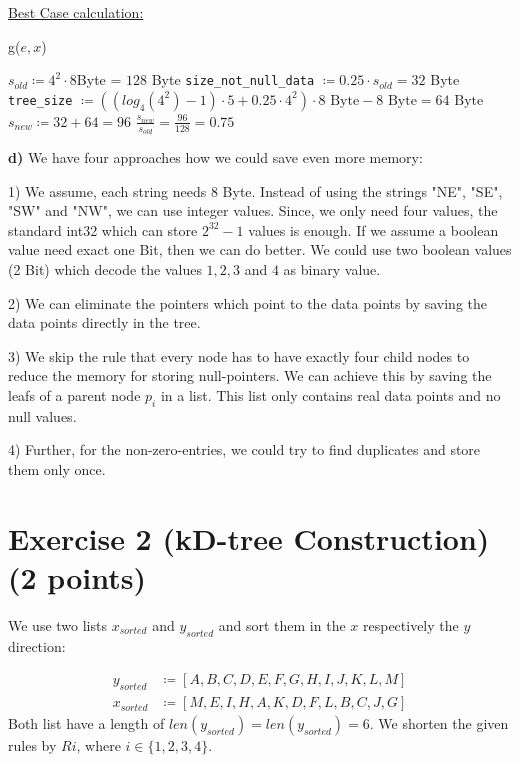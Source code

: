 \documentclass[english, fontsize=12pt, paper=a4, twoside=false, draft=true, pagesize=auto, version=last, DIV=16]{scrartcl}
\theoremstyle{break}
\begin{document}
\underline{Best Case calculation:} \par
\vspace*{-3mm}
\begin{algorithm}
{g($e, x$)} \par
\begin{algorithmic}[1]
	\State $s_{old} \coloneqq 4^2 \cdot 8$Byte = $128$ Byte
	\State \texttt{size\_not\_null\_data} $\coloneqq 0.25 \cdot s_{old} = 32$ Byte
	\State \texttt{tree\_size} $\coloneqq \left( (log_4(4^2) - 1) \cdot 5 + 0.25 \cdot 4^2 \right) \cdot 8 \text{ Byte} - 8 \text{ Byte} = 64 \text{ Byte}$
	\State $s_{new} \coloneqq 32 + 64= 96$ 
   	\State \Return $\frac{s_{new}}{s_{old}} = \frac{96}{128} = 0.75$
\end{algorithmic}
\end{algorithm}\par
\vspace*{15mm}


\textbf{d)}
We have four approaches how we could save even more memory:

1) We assume, each string needs 8 Byte. Instead of using the strings "NE", "SE", "SW" and "NW", we can use integer values. Since, we only need four values, the standard int32 which can store $2^{32}-1$ values is enough. If we assume a boolean value need exact one Bit, then we can do better. We could use two boolean values (2 Bit) which decode the values $1,2,3$ and $4$ as binary value. \par
2) We can eliminate the pointers which point to the data points by saving the data points directly in the tree. \par
3) We skip the rule that every node has to have exactly four child nodes to reduce the memory for storing null-pointers. We can achieve this by saving the leafs of a parent node $p_i$ in a list. This list only contains real data points and no null values. \par
4) Further, for the non-zero-entries, we could try to find duplicates and store them only once. \par
\newpage




\section*{\large Exercise 2 (kD-tree Construction) {\normalsize \hfill (2 points)}}
\vspace*{10mm}
We use two lists $x_{sorted}$ and $y_{sorted}$ and sort them in the $x$ respectively the $y$ direction: \par
\begin{equation}
\begin{aligned}
y_{sorted} & \coloneqq [A,B,C,D,E,F,G,H,I,J,K,L,M] \\[3pt]
x_{sorted} & \coloneqq [M,E,I,H,A,K,D,F,L,B,C,J,G]
\end{aligned}
\end{equation}
Both list have a length of $len(y_{sorted}) = len(y_{sorted}) = 6$. We shorten the given rules by $Ri$, where $i \in \{1,2,3,4\}$. \par
\vspace*{15mm}
\end{document}
